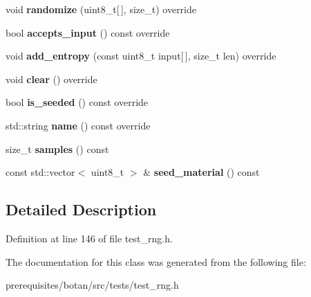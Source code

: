 \begin{DoxyCompactItemize}
\item 
\mbox{\label{class_botan___tests_1_1_seed_capturing___r_n_g_a56a1c45c4c5884f151dd4f30ccc73b66}} 
void {\bfseries randomize} (uint8\+\_\+t\mbox{[}$\,$\mbox{]}, size\+\_\+t) override
\item 
\mbox{\label{class_botan___tests_1_1_seed_capturing___r_n_g_ab4cc45219cbe71342c5cb32fd06abe8d}} 
bool {\bfseries accepts\+\_\+input} () const override
\item 
\mbox{\label{class_botan___tests_1_1_seed_capturing___r_n_g_ab6c6a3116a89e7adc2e038c4ac4e1f79}} 
void {\bfseries add\+\_\+entropy} (const uint8\+\_\+t input\mbox{[}$\,$\mbox{]}, size\+\_\+t len) override
\item 
\mbox{\label{class_botan___tests_1_1_seed_capturing___r_n_g_a5b96bb5c4877435601260ca42b2407c4}} 
void {\bfseries clear} () override
\item 
\mbox{\label{class_botan___tests_1_1_seed_capturing___r_n_g_adbd0008f97fa889642476c9230261556}} 
bool {\bfseries is\+\_\+seeded} () const override
\item 
\mbox{\label{class_botan___tests_1_1_seed_capturing___r_n_g_a835b3ddddc13a8f98cee08f56bef924c}} 
std\+::string {\bfseries name} () const override
\item 
\mbox{\label{class_botan___tests_1_1_seed_capturing___r_n_g_a9ecaa1ffc526736abd63606ded5802a6}} 
size\+\_\+t {\bfseries samples} () const
\item 
\mbox{\label{class_botan___tests_1_1_seed_capturing___r_n_g_a2c13b638857d37d15a577883e1fa486d}} 
const std\+::vector$<$ uint8\+\_\+t $>$ \& {\bfseries seed\+\_\+material} () const
\end{DoxyCompactItemize}


\subsection{Detailed Description}


Definition at line 146 of file test\+\_\+rng.\+h.



The documentation for this class was generated from the following file\+:\begin{DoxyCompactItemize}
\item 
prerequisites/botan/src/tests/test\+\_\+rng.\+h\end{DoxyCompactItemize}
